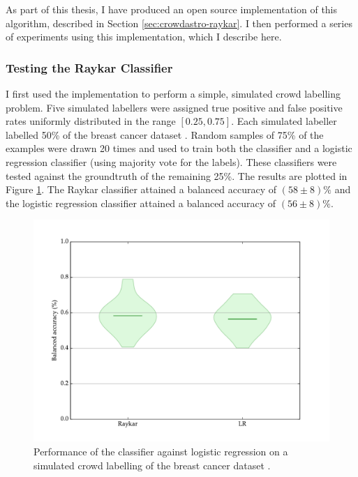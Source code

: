         As part of this thesis, I have produced an open source implementation of
        this algorithm, described in Section \ref{sec:crowdastro-raykar}. I then
        performed a series of experiments using this implementation, which I
        describe here.

        \subsubsection{Testing the Raykar Classifier}

            I first used the implementation to perform a simple, simulated crowd
            labelling problem. Five simulated labellers were assigned true positive
            and false positive rates uniformly distributed in the range $[0.25,
            0.75]$. Each simulated labeller labelled 50\% of the breast cancer dataset . Random samples of
            75\% of the examples were drawn 20 times and used to train both the
            \citeauthor{raykar10} classifier and a logistic regression classifier
            (using majority vote for the labels). These classifiers were tested
            against the groundtruth of the remaining 25\%. The results are plotted
            in Figure \ref{fig:raykar}. The Raykar classifier attained a balanced
            accuracy of $(58 \pm 8)\%$ and the logistic regression classifier
            attained a balanced accuracy of $(56 \pm 8)\%$.

            \begin{figure}[!ht]
                \centering
                \includegraphics[width=\textwidth]{images/experiments/raykar.pdf}
                \caption{Performance of the \citeauthor{raykar10} classifier against
                    logistic regression on a simulated crowd labelling of the breast
                    cancer dataset \citep{wolberg90}.}
                \label{fig:raykar}
            \end{figure}

